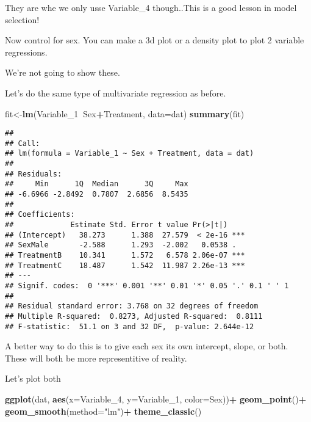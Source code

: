 \documentclass[
]{article}
\newenvironment{Shaded}{\begin{snugshade}}{\end{snugshade}}
\newcommand{\DataTypeTok}[1]{\textcolor[rgb]{0.13,0.29,0.53}{#1}}
\newcommand{\DecValTok}[1]{\textcolor[rgb]{0.00,0.00,0.81}{#1}}
\newcommand{\KeywordTok}[1]{\textcolor[rgb]{0.13,0.29,0.53}{\textbf{#1}}}
\newcommand{\NormalTok}[1]{#1}
\newcommand{\OperatorTok}[1]{\textcolor[rgb]{0.81,0.36,0.00}{\textbf{#1}}}
\newcommand{\StringTok}[1]{\textcolor[rgb]{0.31,0.60,0.02}{#1}}
\begin{document}
They are whe we only usse Variable\_4 though..This is a good lesson in
model selection!

Now control for sex. You can make a 3d plot or a density plot to plot 2
variable regressions.

We're not going to show these.

Let's do the same type of multivariate regression as before.

\begin{Shaded}
\begin{Highlighting}[]
\NormalTok{fit<-}\KeywordTok{lm}\NormalTok{(Variable_}\DecValTok{1}\OperatorTok{~}\NormalTok{Sex}\OperatorTok{+}\NormalTok{Treatment, }\DataTypeTok{data=}\NormalTok{dat)}
\KeywordTok{summary}\NormalTok{(fit)}
\end{Highlighting}
\end{Shaded}

\begin{verbatim}
## 
## Call:
## lm(formula = Variable_1 ~ Sex + Treatment, data = dat)
## 
## Residuals:
##     Min      1Q  Median      3Q     Max 
## -6.6966 -2.8492  0.7807  2.6856  8.5435 
## 
## Coefficients:
##             Estimate Std. Error t value Pr(>|t|)    
## (Intercept)   38.273      1.388  27.579  < 2e-16 ***
## SexMale       -2.588      1.293  -2.002   0.0538 .  
## TreatmentB    10.341      1.572   6.578 2.06e-07 ***
## TreatmentC    18.487      1.542  11.987 2.26e-13 ***
## ---
## Signif. codes:  0 '***' 0.001 '**' 0.01 '*' 0.05 '.' 0.1 ' ' 1
## 
## Residual standard error: 3.768 on 32 degrees of freedom
## Multiple R-squared:  0.8273, Adjusted R-squared:  0.8111 
## F-statistic:  51.1 on 3 and 32 DF,  p-value: 2.644e-12
\end{verbatim}

A better way to do this is to give each sex its own intercept, slope, or
both. These will both be more representitive of reality.

Let's plot both

\begin{Shaded}
\begin{Highlighting}[]
\KeywordTok{ggplot}\NormalTok{(dat, }\KeywordTok{aes}\NormalTok{(}\DataTypeTok{x=}\NormalTok{Variable_}\DecValTok{4}\NormalTok{, }\DataTypeTok{y=}\NormalTok{Variable_}\DecValTok{1}\NormalTok{, }\DataTypeTok{color=}\NormalTok{Sex))}\OperatorTok{+}
\StringTok{  }\KeywordTok{geom_point}\NormalTok{()}\OperatorTok{+}
\StringTok{  }\KeywordTok{geom_smooth}\NormalTok{(}\DataTypeTok{method=}\StringTok{"lm"}\NormalTok{)}\OperatorTok{+}
\StringTok{  }\KeywordTok{theme_classic}\NormalTok{()}
\end{Highlighting}
\end{Shaded}
\end{document}
